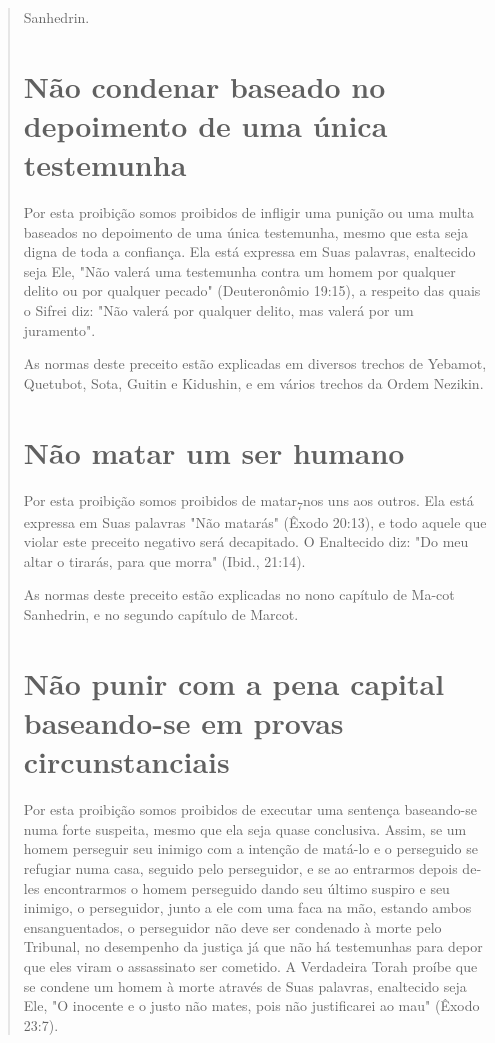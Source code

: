 \begin{quote}
Sanhedrin.

\section{Não condenar baseado no depoimento de uma única testemunha}

Por esta proibição somos proibidos de infligir uma punição ou uma multa
baseados no depoimento de uma única testemunha, mesmo que esta seja
digna de toda a confiança. Ela está expressa em Suas palavras,
enaltecido seja Ele, "Não valerá uma testemunha contra um homem por
qualquer delito ou por qualquer pecado" (Deuteronômio 19:15), a respeito
das quais o Sifrei diz: "Não valerá por qualquer delito, mas valerá por
um juramento".

As normas deste preceito estão explicadas em diversos trechos de
Yebamot, Quetubot, Sota, Guitin e Kidushin, e em vários trechos da Ordem
Nezikin.

\section{Não matar um ser humano}

Por esta proibição somos proibidos de matar\textsubscript{7}nos uns aos
outros. Ela está expressa em Suas palavras "Não matarás" (Êxodo 20:13),
e todo aquele que violar este preceito negativo será decapitado. O
Enaltecido diz: "Do meu altar o tirarás, para que morra" (Ibid., 21:14).

As normas deste preceito estão explicadas no nono capítulo de Ma-cot
Sanhedrin, e no segundo capítulo de Marcot.


\section{Não punir com a pena capital baseando-se em provas circunstanciais}

Por esta proibição somos proibidos de executar uma sentença baseando-se
numa forte suspeita, mesmo que ela seja quase conclusiva. Assim, se um
homem perseguir seu inimigo com a intenção de matá-lo e o perseguido se
refugiar numa casa, seguido pelo perseguidor, e se ao entrarmos depois
de­les encontrarmos o homem perseguido dando seu último suspiro e seu
inimi­go, o perseguidor, junto a ele com uma faca na mão, estando ambos
ensanguen­tados, o perseguidor não deve ser condenado à morte pelo
Tribunal, no de­sempenho da justiça já que não há testemunhas para depor
que eles viram o assassinato ser cometido. A Verdadeira Torah proíbe que
se condene um ho­mem à morte através de Suas palavras, enaltecido seja
Ele, "O inocente e o jus­to não mates, pois não justificarei ao mau"
(Êxodo 23:7).


\end{quote}
